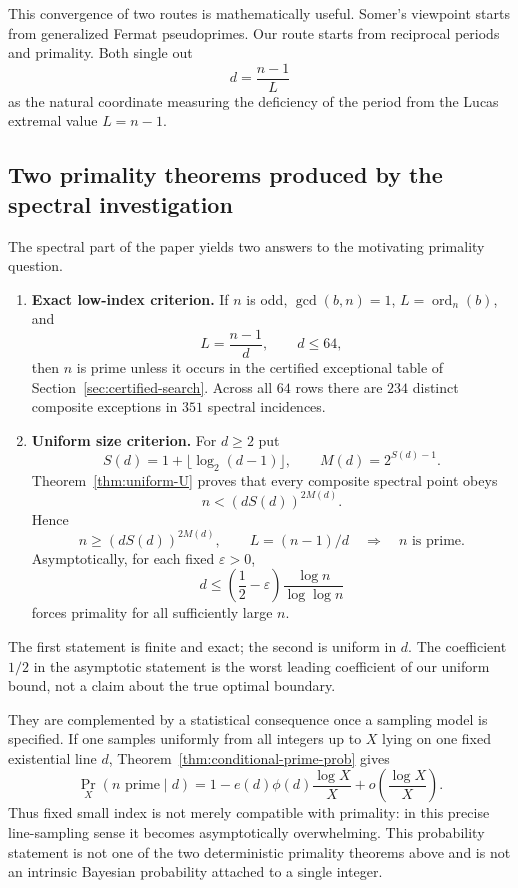 \documentclass[11pt]{article}
\newcommand{\ord}{\operatorname{ord}}
\begin{document}
This convergence of two routes is mathematically useful.  Somer's viewpoint
starts from generalized Fermat pseudoprimes.  Our route starts from reciprocal
periods and primality.  Both single out
\[
d=\frac{n-1}{L}
\]
as the natural coordinate measuring the deficiency of the period from the
Lucas extremal value $L=n-1$.

\subsection*{Two primality theorems produced by the spectral investigation}

The spectral part of the paper yields two answers to the motivating primality
question.

\begin{enumerate}[label=\textbf{P\arabic*.},leftmargin=2.4em]
\item \textbf{Exact low-index criterion.}
If $n$ is odd, $\gcd(b,n)=1$, $L=\ord_n(b)$, and
\[
L=\frac{n-1}{d},\qquad d\le64,
\]
then $n$ is prime unless it occurs in the certified exceptional table of
Section~\ref{sec:certified-search}.  Across all $64$ rows there are $234$ distinct composite exceptions in $351$ spectral incidences.

\item \textbf{Uniform size criterion.}
For $d\ge2$ put
\[
S(d)=1+\lfloor\log_2(d-1)\rfloor,
\qquad
M(d)=2^{S(d)-1}.
\]
Theorem~\ref{thm:uniform-U} proves that every composite spectral point obeys
\[
n<(dS(d))^{2M(d)}.
\]
Hence
\[
n\ge(dS(d))^{2M(d)},\qquad L=(n-1)/d
\quad\Longrightarrow\quad n\text{ is prime}.
\]
Asymptotically, for each fixed $\varepsilon>0$,
\[
d\le\left(\frac12-\varepsilon\right)
\frac{\log n}{\log\log n}
\]
forces primality for all sufficiently large $n$.
\end{enumerate}

The first statement is finite and exact; the second is uniform in $d$.  The
coefficient $1/2$ in the asymptotic statement is the worst leading coefficient
of our uniform bound, not a claim about the true optimal boundary.

They are complemented by a statistical consequence once a sampling model is
specified.  If one samples uniformly from all integers up to $X$ lying on one
fixed existential line $d$, Theorem~\ref{thm:conditional-prime-prob} gives
\[
\Pr_X(n\text{ prime}\mid d)
=1-e(d)\phi(d)\frac{\log X}{X}
+o\!\left(\frac{\log X}{X}\right).
\]
Thus fixed small index is not merely compatible with primality: in this precise
line-sampling sense it becomes asymptotically overwhelming.  This probability
statement is not one of the two deterministic primality theorems above and is
not an intrinsic Bayesian probability attached to a single integer.
\end{document}

